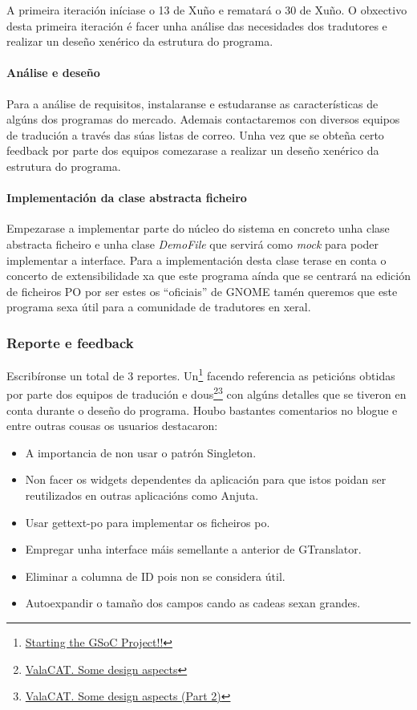 A primeira iteración iníciase o 13 de Xuño e rematará o 30 de Xuño. O obxectivo desta primeira iteración é facer unha análise das necesidades dos tradutores e realizar un deseño xenérico da estrutura do programa.

\paragraph{Análise e deseño}
Para a análise de requisitos, instalaranse e estudaranse as características de algúns dos programas do mercado. Ademais contactaremos con diversos equipos de tradución a través das súas listas de correo. Unha vez que se obteña certo feedback por parte dos equipos comezarase a realizar un deseño xenérico da estrutura do programa.

\paragraph{Implementación da clase abstracta ficheiro}
Empezarase a implementar parte do núcleo do sistema en concreto unha clase abstracta ficheiro e unha clase \emph{DemoFile} que servirá como \emph{mock} para poder implementar a interface. Para a implementación desta clase terase en conta o concerto de extensibilidade xa que este programa aínda que se centrará na edición de ficheiros PO por ser estes os ``oficiais'' de GNOME tamén queremos que este programa sexa útil para a comunidade de tradutores en xeral.

\subsubsection{Reporte e feedback}
Escribíronse un total de 3 reportes. Un\footnote{\href{http://aquelando.info/startinggsocprojec/}{Starting the GSoC Project!!}} facendo referencia as peticións obtidas por parte dos equipos de tradución e dous\footnote{\href{http://aquelando.info/valacat-some-design-aspects/}{ValaCAT. Some design aspects}}\footnote{\href{http://aquelando.info/valacat-some-design-aspects-part-2/}{ValaCAT. Some design aspects (Part 2)}} con algúns detalles que se tiveron en conta durante o deseño do programa. Houbo bastantes comentarios no blogue e entre outras cousas os usuarios destacaron:

\begin{itemize}
  \item A importancia de non usar o patrón Singleton.
  \item Non facer os widgets dependentes da aplicación para que istos poidan ser reutilizados en outras aplicacións como Anjuta.
  \item Usar gettext-po para implementar os ficheiros po.
  \item Empregar unha interface máis semellante a anterior de GTranslator.
  \item Eliminar a columna de ID pois non se considera útil.
  \item Autoexpandir o tamaño dos campos cando as cadeas sexan grandes.
\end{itemize}

